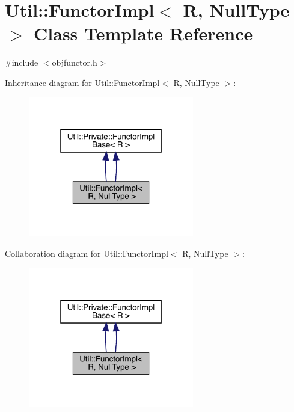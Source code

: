 \hypertarget{classUtil_1_1FunctorImpl_3_01R_00_01NullType_01_4}{}\section{Util\+:\+:Functor\+Impl$<$ R, Null\+Type $>$ Class Template Reference}
\label{classUtil_1_1FunctorImpl_3_01R_00_01NullType_01_4}


{\ttfamily \#include $<$objfunctor.\+h$>$}



Inheritance diagram for Util\+:\+:Functor\+Impl$<$ R, Null\+Type $>$\+:\nopagebreak
\begin{figure}[H]
\begin{center}
\leavevmode
\includegraphics[width=205pt]{d2/dde/classUtil_1_1FunctorImpl_3_01R_00_01NullType_01_4__inherit__graph}
\end{center}
\end{figure}


Collaboration diagram for Util\+:\+:Functor\+Impl$<$ R, Null\+Type $>$\+:\nopagebreak
\begin{figure}[H]
\begin{center}
\leavevmode
\includegraphics[width=205pt]{d6/da0/classUtil_1_1FunctorImpl_3_01R_00_01NullType_01_4__coll__graph}
\end{center}
\end{figure}
